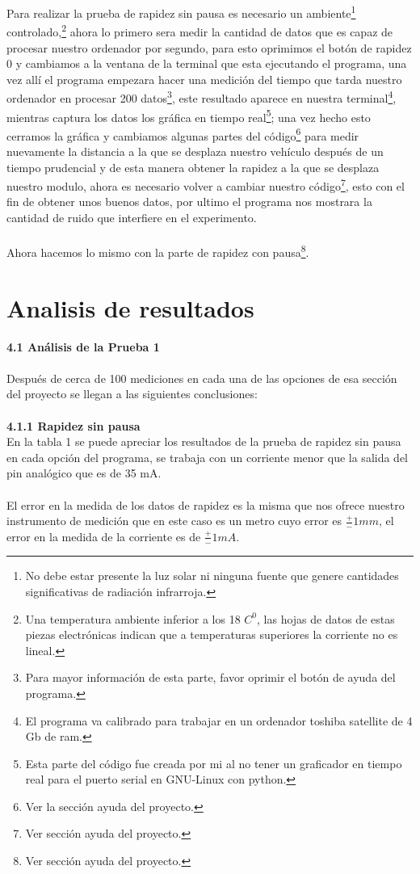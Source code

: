 \documentclass[12]{article}
\begin{document}
\begin{multicols}{2}
Para realizar la prueba de rapidez sin pausa es necesario un ambiente\footnote{No debe estar presente la luz solar ni ninguna fuente que genere cantidades significativas de radiación infrarroja.} controlado,\footnote{Una temperatura ambiente inferior a los 18 $C^{0}$, las hojas de datos de estas piezas electrónicas indican que a temperaturas superiores la corriente no es lineal.} ahora lo primero sera medir la cantidad de datos que es capaz de procesar nuestro ordenador por segundo, para esto oprimimos el botón de rapidez 0 y cambiamos a la ventana de la terminal que esta ejecutando el programa, una vez allí el programa empezara hacer una medición del tiempo que tarda nuestro ordenador en procesar 200 datos\footnote{Para mayor información de esta parte, favor oprimir el botón de ayuda del programa.}, este resultado aparece en nuestra terminal\footnote{El programa va calibrado para trabajar en un ordenador toshiba satellite de 4 Gb de ram.}, mientras captura los datos los gráfica en tiempo real\footnote{Esta parte del código fue creada por mi al no tener un graficador en tiempo real para el puerto serial en GNU-Linux con python.};  una vez hecho esto cerramos la gráfica y cambiamos algunas partes del código\footnote{Ver la sección ayuda del proyecto.} para medir nuevamente  la distancia a la que se desplaza nuestro vehículo después de un tiempo prudencial y de esta manera obtener la rapidez a la que se desplaza nuestro modulo,  ahora es necesario volver a cambiar nuestro código\footnote{Ver sección ayuda del proyecto.}, esto con el fin de obtener unos buenos datos, por ultimo el programa nos mostrara la cantidad de ruido que interfiere en el experimento.  \\\\
Ahora hacemos lo mismo con la parte de rapidez con pausa\footnote{Ver sección ayuda del proyecto.}.

\section{Analisis de resultados}
{\bf{4.1 Análisis de la Prueba 1}}\\\\
Después de cerca de 100 mediciones en cada una de las opciones de esa sección del proyecto se llegan a las siguientes conclusiones: \\\\
{\bf{4.1.1 Rapidez sin pausa}}\\

En la tabla 1 se puede apreciar los resultados de la prueba de rapidez sin pausa en cada opción del programa, se trabaja con un corriente menor que la salida del pin analógico que es de 35 mA.\\\\
El error en la medida de los datos de rapidez es la misma que nos ofrece nuestro instrumento de medición que en este caso es un metro cuyo error es $\frac{+}{-} 1 mm$, el error en la medida de la corriente es de $\frac{+}{-} 1 mA$.\\


\end{multicols}
\end{document}
